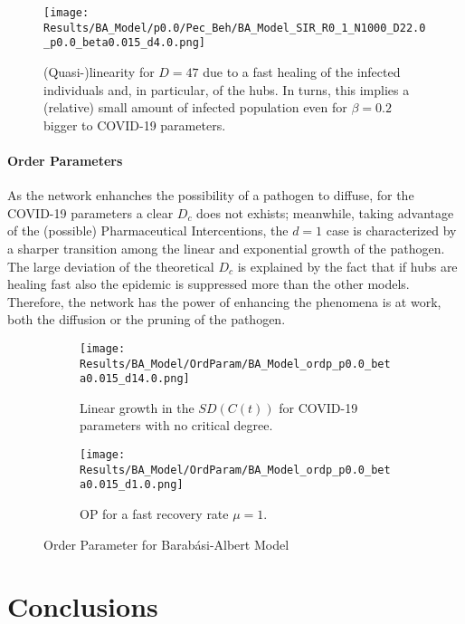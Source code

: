 \documentclass[a4paper,10pt,twoside]{book} %
\theoremstyle{definition}
\begin{document}
\clearpage
\begin{figure}[H]
	\centering
	\texttt{[image: Results/BA\_Model/p0.0/Pec\_Beh/BA\_Model\_SIR\_R0\_1\_N1000\_D22.0\_p0.0\_beta0.015\_d4.0.png]}
	\caption{(Quasi-)linearity for $D = 47$ due to a fast healing of the infected individuals and, in particular, of the hubs. In turns, this implies a (relative) small amount of infected population even for $\beta = 0.2$ bigger to COVID-19 parameters.}
	\label{fig:sir_BA_d122}
\end{figure}

\clearpage
\subsubsection*{Order Parameters}
As the network enhanches the possibility of a pathogen to diffuse, for the COVID-19 parameters a clear $D_c$ does not exhists; meanwhile, taking advantage of the (possible) Pharmaceutical Intercentions, the $d = 1$ case is characterized by a sharper transition among the linear and exponential growth of the pathogen. The large deviation of the theoretical $D_c$ is explained by the fact that if hubs are healing fast also the epidemic is suppressed more than the other models. Therefore, the network has the power of enhancing the phenomena is at work, both the diffusion or the pruning of the pathogen. 

\begin{figure}[t]
	\begin{subfigure}[t]{0.48\linewidth}
		\centering
		\texttt{[image: Results/BA\_Model/OrdParam/BA\_Model\_ordp\_p0.0\_beta0.015\_d14.0.png]}
		\caption{Linear growth in the $SD(C(t))$ for COVID-19 parameters with no critical degree.}
		\label{fig:Ordp_BA_d14}
	\end{subfigure}
	\hfill
	\begin{subfigure}[t]{0.48\linewidth}
		\centering
		\texttt{[image: Results/BA\_Model/OrdParam/BA\_Model\_ordp\_p0.0\_beta0.015\_d1.0.png]}
		\caption{OP for a fast recovery rate $ \mu = 1$.}
		\label{fig:Ordp_BA_COVID_d1}
	\end{subfigure}
	\caption{Order Parameter for Barabási-Albert Model}
	\label{fig:Ordp_BA_COVID}
\end{figure}



\chapter{Conclusions}
\end{document}
